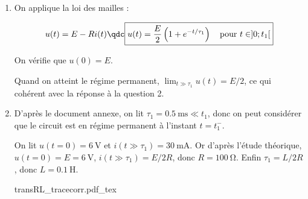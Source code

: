 \documentclass[a4paper, 10pt, garamond, oneside]{book}
\begin{document}
{\begin{enumerate}
		      \[
			      i(0)=0=B_1+\frac{E}{2R}
			      \qsoit
			      B_1=-\frac{E}{2R}\qdonc
			      \boxed{i(t)= \frac{E}{2R}\left (1-e^{-t/\tau_1}  \right )\quad\mbox{pour } t\in]0;t_1[}
		      \]

		      Quand on atteint le régime permanent, $\lim_{t\gg \tau_1}i(t)= E/(2R)$, ce qui cohérent avec la réponse à la question 2.
		\item
		      On applique la loi des mailles :

		      \[
			      u(t)=E-Ri(t)
			      \qdc
			      \boxed{u(t)=\frac{E}{2}\left ( 1+e^{-t/\tau_1} \right )\quad\mbox{pour } t\in]0;t_1[}
		      \]

		      On vérifie que $u(0)=E$.

		      Quand on atteint le régime permanent, $\lim_{t\gg \tau_1}u(t)= E/2$, ce qui
		      cohérent avec la réponse à la question 2.
		\item
		      D'après le document annexe, on lit $\boxed{\tau_1=\SI{0,5}{\milli\second}\ll t_1}$, donc on peut considérer que le circuit est en régime permanent à l'instant $t=t_1^-$.

		      On lit $u(t=0)=\SI{6}{\volt}$ et $i(t\gg\tau_1)=\SI{30}{\milli\ampere}$. Or d'après l'étude théorique, $\boxed{u(t=0)=E=\SI{6}{\volt}}$, $i(t\gg\tau_1)=E/2R$, donc $\boxed{R=\SI{100}{\ohm}}$. Enfin $\tau_1=L/2R$, donc $\boxed{L=\SI{0,1}{\henry}}$.

		      \begin{center}
			      {transRL_tracecorr.pdf_tex}
		      \end{center}

	\end{enumerate}
}
\end{document}
